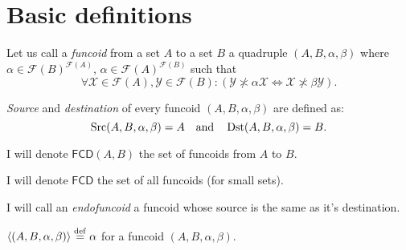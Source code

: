 \section{Basic definitions}
\begin{defn}
Let us call a \emph{funcoid} from a set $A$ to a
set $B$ a quadruple $(A,B,\alpha,\beta)$ where
$\alpha\in\mathscr{F}(B)^{\mathscr{F}(A)}$,
$\alpha\in\mathscr{F}(A)^{\mathscr{F}(B)}$ such that
\[
\forall\mathcal{X}\in\mathscr{F}(A),\mathcal{Y}\in\mathscr{F}(B):(\mathcal{Y}
\nasymp\alpha\mathcal{X}\Leftrightarrow\mathcal{X}\nasymp\beta\mathcal{Y}).
\]

\end{defn}

\begin{defn}
\emph{Source} and
\emph{destination} of every funcoid $(A,B,\alpha,\beta)$ are defined
as:
\[
\operatorname{Src}(A,B,\alpha,\beta)=A\quad\text{and}\quad\operatorname{Dst}(A,B,\alpha,\beta)=B.
\]

\end{defn}
I will denote $\mathsf{FCD}(A,B)$ the set of funcoids from $A$ to
$B$.

I will denote $\mathsf{FCD}$ the set of all funcoids (for small sets).
\begin{defn}
I will call an \emph{endofuncoid} a funcoid whose source is the same as it's destination.
\end{defn}

\begin{defn}
$\left\langle (A,B,\alpha,\beta)\right\rangle\overset{\mathrm{def}}{=}\alpha$ for a funcoid $(A,B,\alpha,\beta)$.
\end{defn}

